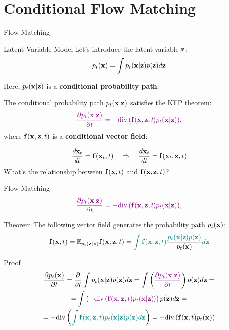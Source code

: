 \documentclass{beamer}
\renewcommand{\eqpause}{}
\renewcommand{\nextonslide}[1]{#1}
\begin{document}
\section{Conditional Flow Matching}
\begin{frame}{Flow Matching}
	\vspace{-0.5cm}
	\begin{block}{Latent Variable Model}
		Let's introduce the latent variable $\mathbf{z}$:
		\[
			p_t(\mathbf{x}) = \int p_t(\mathbf{x} | \mathbf{z}) p(\mathbf{z}) d \mathbf{z} 
		\]
		\vspace{-0.5cm}
	\end{block}
	Here, $p_t(\mathbf{x} | \mathbf{z})$ is a \textbf{conditional probability path}.
	\eqpause
	The conditional probability path $p_t(\mathbf{x} | \mathbf{z})$ satisfies the KFP theorem:
	\[
		{\color{violet}\frac{\partial p_t(\mathbf{x} | \mathbf{z})}{\partial t} = - \text{div}\left(\mathbf{f}(\mathbf{x}, \mathbf{z}, t) p_t(\mathbf{x} | \mathbf{z})\right)},
	\]
	where $\mathbf{f}(\mathbf{x}, \mathbf{z}, t)$ is a \textbf{conditional vector field}:
	\eqpause
	\[
		\frac{d\mathbf{x}_t}{dt} = \mathbf{f}(\mathbf{x}_t, t) \quad \Rightarrow \quad \frac{d\mathbf{x}_t}{dt} = \mathbf{f}(\mathbf{x}_t, \mathbf{z}, t)
	\]
	\vspace{-0.3cm}
	What's the relationship between $\mathbf{f}(\mathbf{x}, t)$ and $\mathbf{f}(\mathbf{x}, \mathbf{z}, t)$?
\end{frame}
\begin{frame}{Flow Matching}
	\[
		{\color{violet}\frac{\partial p_t(\mathbf{x} | \mathbf{z})}{\partial t} = - \text{div}\left(\mathbf{f}(\mathbf{x}, \mathbf{z}, t) p_t(\mathbf{x} | \mathbf{z})\right)},
	\]
	\vspace{-0.3cm}
	\begin{block}{Theorem}
		The following vector field generates the probability path $p_t(\mathbf{x})$:
		\vspace{-0.2cm}
		\[
			\mathbf{f}(\mathbf{x}, t) = \mathbb{E}_{p_t(\mathbf{z} | \mathbf{x})} \mathbf{f}(\mathbf{x}, \mathbf{z}, t)  = {\color{teal}\int \mathbf{f}(\mathbf{x}, \mathbf{z}, t)} \frac{\color{teal}p_t(\mathbf{x} | \mathbf{z}) p(\mathbf{z})}{p_t(\mathbf{x})} {\color{teal}d \mathbf{z}}
		\]
		\vspace{-0.5cm}
	\end{block}
    \eqpause
	\begin{block}{Proof}
		\vspace{-0.7cm}
		\begin{multline*}
			\frac{\partial p_t(\bx)}{\partial t} = \frac{\partial}{\partial t} \int p_t(\bx | \bz) p(\bz) d \bz 
			\nextonslide{=  \int \left( {\color{violet} \frac{\partial p_t(\bx | \bz)}{\partial t} } \right) p(\bz) d \bz}
			\nextonslide{ = \\ = \int \left( {\color{violet} - \text{div}\left(\bff(\bx, \bz, t) p_t(\bx | \bz)\right) } \right) p(\bz) d \bz}
			\nextonslide{ = \\ = - \text{div} \left({\color{teal}\int \bff(\bx, \bz, t) p_t(\bx | \bz) p(\bz) d \bz }\right)} 
			\nextonslide{= - \text{div}  \left(\bff(\bx, t) p_t(\bx)\right)}
		\end{multline*}
	\end{block}
\end{frame}
\end{document}
